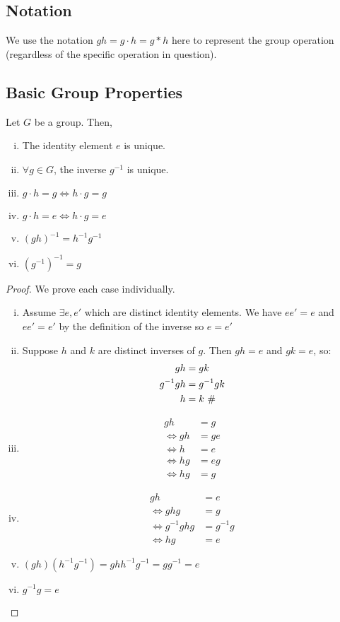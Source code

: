 \subsection{Notation}
We use the notation $gh=g\cdot h = g \ast h$ here to represent the group operation (regardless of the specific operation in question).
\subsection{Basic Group Properties}
\begin{proposition}
	Let $G$ be a group. Then,
	\begin{enumerate}[i.]
		\item The identity element $e$ is unique.
		\item $\forall g \in G$, the inverse $g^{-1}$ is unique.
		\item $g \cdot h = g \iff h \cdot g = g$
		\item $g \cdot h = e \iff h \cdot g = e$
		\item $(gh)^{-1} = h^{-1} g^{-1}$
		\item $(g^{-1})^{-1} = g$
	\end{enumerate}
\end{proposition}
\begin{proof}
	We prove each case individually.
	\begin{enumerate}[i.]
		\item Assume $\exists e, e'$ which are distinct identity elements. We have $e e' = e$ and $e e' = e'$ by the definition of the inverse so $e = e'$ \contradiction
		\item Suppose $h$ and $k$ are distinct inverses of $g$. Then $gh = e$ and $gk = e$, so:
		      \begin{align*}
			      gh        & = gk                       \\
			      g^{-1} gh & = g^{-1} gk                \\
			      h         & = k \text{ $\#$}
		      \end{align*}
		\item \begin{align*}
			      gh      & = g  \\
			      \iff gh & = ge \\
			      \iff h  & = e  \\
			      \iff hg & = eg \\
			      \iff hg & = g
		      \end{align*}
		\item \begin{align*}
			      gh              & = e       \\
			      \iff ghg        & = g       \\
			      \iff g^{-1} ghg & = g^{-1}g \\
			      \iff hg         & = e
		      \end{align*}
		\item $(gh) (h^{-1}g^{-1}) = g h h^{-1} g^{-1} = g g^{-1} = e$
		\item $g^{-1} g = e$
	\end{enumerate}
\end{proof}

